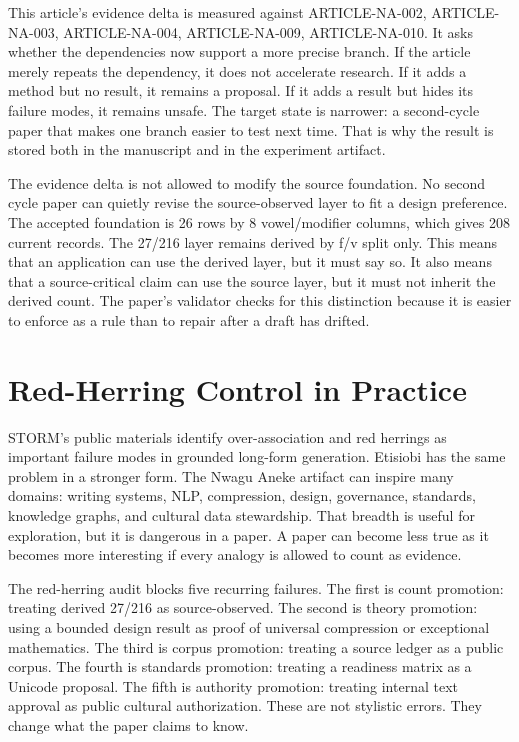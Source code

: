 \documentclass[sigconf,nonacm]{acmart}
\begin{document}
This article's evidence delta is measured against ARTICLE-NA-002, ARTICLE-NA-003, ARTICLE-NA-004, ARTICLE-NA-009, ARTICLE-NA-010. It asks whether the
dependencies now support a more precise branch. If the article merely repeats
the dependency, it does not accelerate research. If it adds a method but no
result, it remains a proposal. If it adds a result but hides its failure modes,
it remains unsafe. The target state is narrower: a second-cycle paper that makes
one branch easier to test next time. That is why the result is stored both in
the manuscript and in the experiment artifact.

The evidence delta is not allowed to modify the source foundation. No second
cycle paper can quietly revise the source-observed layer to fit a design
preference. The accepted foundation is 26 rows by 8 vowel/modifier columns,
which gives 208 current records. The 27/216 layer remains derived by f/v split
only. This means that an application can use the derived layer, but it must say
so. It also means that a source-critical claim can use the source layer, but it
must not inherit the derived count. The paper's validator checks for this
distinction because it is easier to enforce as a rule than to repair after a
draft has drifted.

\section{Red-Herring Control in Practice}
STORM's public materials identify over-association and red herrings as important
failure modes in grounded long-form generation. Etisiobi has the same problem in
a stronger form. The Nwagu Aneke artifact can inspire many domains: writing
systems, NLP, compression, design, governance, standards, knowledge graphs, and
cultural data stewardship. That breadth is useful for exploration, but it is
dangerous in a paper. A paper can become less true as it becomes more
interesting if every analogy is allowed to count as evidence.

The red-herring audit blocks five recurring failures. The first is count
promotion: treating derived 27/216 as source-observed. The second is theory
promotion: using a bounded design result as proof of universal compression or
exceptional mathematics. The third is corpus promotion: treating a source
ledger as a public corpus. The fourth is standards promotion: treating a
readiness matrix as a Unicode proposal. The fifth is authority promotion:
treating internal text approval as public cultural authorization. These are not
stylistic errors. They change what the paper claims to know.
\end{document}

